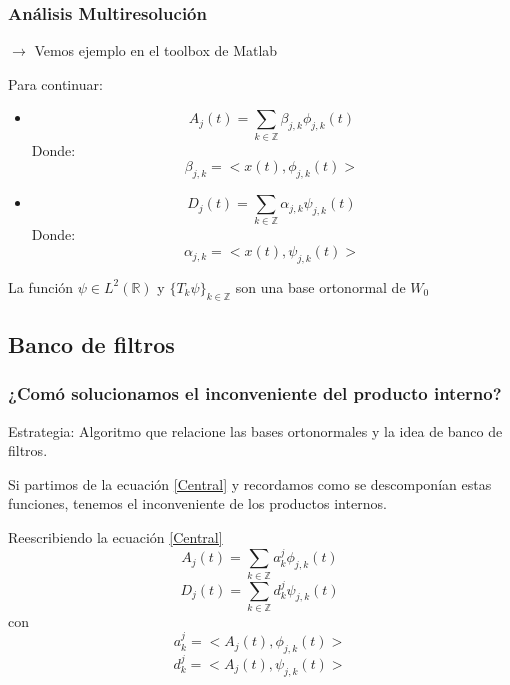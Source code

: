\documentclass{beamer}
\begin{document}
\begin{frame}
\frametitle{Análisis Multiresolución}
$\rightarrow$ Vemos ejemplo en el toolbox de Matlab
  
Para continuar:
\begin{itemize}
  \item 
  \begin{equation}
    A_j(t)=\sum_{k \in \mathbb Z} \beta _{j,k} \phi _{j,k}(t)
  \end{equation}
  Donde:
  \begin{equation}
    \label{Beta}
    \beta _{j,k}= <x(t), \phi _{j,k}(t)>
  \end{equation}

  \item
  \begin{equation}
    D_j(t)=\sum_{k \in \mathbb Z} \alpha _{j,k} \psi _{j,k}(t)
  \end{equation}
  Donde:
  \begin{equation}
    \label{Alfa}
    \alpha _{j,k}= <x(t), \psi _{j,k}(t)>
  \end{equation}
\end{itemize}
La función $\psi \in L^{2}(\mathbb{R})$ y $\{T_k \psi \}_{k \in \mathbb{Z}}$ son una base ortonormal de $W_0$
\end{frame}


\subsection{Banco de filtros}
  
  \begin{frame}
    \frametitle{¿Comó solucionamos el inconveniente del producto interno?}
    
    Estrategia: Algoritmo que relacione las bases ortonormales y la idea de banco de filtros.
      
     Si partimos de la ecuación \ref{Central} y recordamos como se descomponían estas funciones, tenemos el inconveniente de los productos internos.
        
  \end{frame}

   \begin{frame}

Reescribiendo la ecuación \ref{Central} 
   \begin{equation}
\label{Aj}
A_j(t)=\sum_{k \in \mathbb Z}  a^{j}_{k} \phi _{j,k}(t)
\end{equation} 
\begin{equation}
\label{Dj}
D_j(t)=\sum_{k \in \mathbb Z}  d^{j}_{k} \psi _{j,k}(t)
\end{equation} 
con
\begin{equation}
\label{ajk}
a^{j}_{k}= <A_{j}(t), \phi _{j,k}(t)>
\end{equation}
\begin{equation}
\label{ajk}
d^{j}_{k}= <A_{j}(t), \psi _{j,k}(t)>
\end{equation}
    \end{frame}
    
\end{document}
